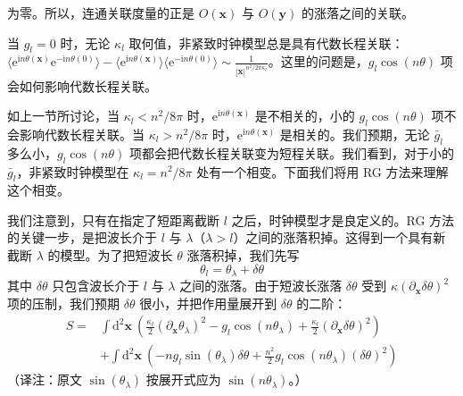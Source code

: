 为零。所以，连通关联度量的正是 $O(\pmb{x})$ 与 $O(\pmb{y})$ 的涨落之间的关联。

当 $g_{l} = 0$ 时，无论 $\kappa_{l}$ 取何值，非紧致时钟模型总是具有代数长程关联：$\langle \mathrm{e}^{\mathrm{i}n\theta(\pmb{x})}\mathrm{e}^{-\mathrm{i}n\theta(0)}\rangle - \langle \mathrm{e}^{\mathrm{i}n\theta(\pmb{x})}\rangle\langle \mathrm{e}^{-\mathrm{i}n\theta(0)}\rangle \sim \frac{1}{|\pmb{x}|^{n^{2}/2\pi\kappa_{l}}}$。这里的问题是，$g_{l}\cos(n\theta)$ 项会如何影响代数长程关联。

如上一节所讨论，当 $\kappa_{l} < n^{2}/8\pi$ 时，$\mathrm{e}^{\mathrm{i}n\theta(\pmb{x})}$ 是不相关的，小的 $g_{l}\cos(n\theta)$ 项不会影响代数长程关联。当 $\kappa_{l} > n^{2}/8\pi$ 时，$\mathrm{e}^{\mathrm{i}n\theta(\pmb{x})}$ 是相关的。我们预期，无论 $\bar{g}_{l}$ 多么小，$g_{l}\cos(n\theta)$ 项都会把代数长程关联变为短程关联。我们看到，对于小的 $\bar{g}_{l}$，非紧致时钟模型在 $\kappa_{l} = n^{2}/8\pi$ 处有一个相变。下面我们将用 RG 方法来理解这个相变。

我们注意到，只有在指定了短距离截断 $l$ 之后，时钟模型才是良定义的。RG 方法的关键一步，是把波长介于 $l$ 与 $\lambda$（$\lambda > l$）之间的涨落积掉。这得到一个具有新截断 $\lambda$ 的模型。为了把短波长 $\theta$ 涨落积掉，我们先写
\begin{equation*}
\theta_{l} = \theta_{\lambda} + \delta\theta
\end{equation*}
其中 $\delta\theta$ 只包含波长介于 $l$ 与 $\lambda$ 之间的涨落。由于短波长涨落 $\delta\theta$ 受到 $\kappa(\partial_{\pmb{x}}\delta\theta)^{2}$ 项的压制，我们预期 $\delta\theta$ 很小，并把作用量展开到 $\delta\theta$ 的二阶：
\begin{equation*}
\begin{aligned}
S = {} & \int \mathrm{d}^{2}\pmb{x}\ \left( \frac{\kappa_{l}}{2}(\partial_{\pmb{x}}\theta_{\lambda})^{2} - g_{l}\cos(n\theta_{\lambda}) + \frac{\kappa_{l}}{2}(\partial_{\pmb{x}}\delta\theta)^{2} \right) \\
& + \int \mathrm{d}^{2}\pmb{x}\ \left( -ng_{l}\sin(\theta_{\lambda})\delta\theta + \frac{n^{2}}{2}g_{l}\cos(n\theta_{\lambda})(\delta\theta)^{2} \right)
\end{aligned}
\end{equation*}
（译注：原文 $\sin(\theta_{\lambda})$ 按展开式应为 $\sin(n\theta_{\lambda})$。）

